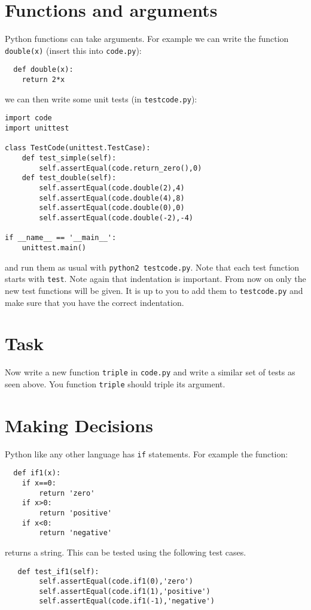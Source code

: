 \documentclass{paper}
\begin{document}
\section*{Functions and arguments}
Python functions can take arguments. For example we can write the
function {\tt double(x)} (insert this into {\tt code.py}):
\begin{lstlisting}
  def double(x):
    return 2*x
\end{lstlisting}
we can then write some unit tests (in {\tt testcode.py}):
\begin{lstlisting}
import code
import unittest

class TestCode(unittest.TestCase):
    def test_simple(self):
        self.assertEqual(code.return_zero(),0)
    def test_double(self):
        self.assertEqual(code.double(2),4)
        self.assertEqual(code.double(4),8)
        self.assertEqual(code.double(0),0)
        self.assertEqual(code.double(-2),-4)

if __name__ == '__main__':
    unittest.main()

  \end{lstlisting} and run them as usual with {\tt python2 testcode.py}. Note that each test
  function starts with {\tt test}. Note again that indentation is
  important. From now on only the new test functions will be given. It is up
  to you to add them to {\tt testcode.py} and make sure that you have the
  correct indentation.

\section{Task}
Now write a new function {\tt triple} in {\tt code.py} and write a
similar set of tests as seen above. You function {\tt triple} should triple
its argument.

\section*{Making Decisions}
Python like any other language has {\tt if} statements. For example
the function:
\begin{lstlisting}
  def if1(x):
    if x==0:
        return 'zero'
    if x>0:
        return 'positive'
    if x<0:
        return 'negative'
\end{lstlisting}
returns a string. This can be tested using the following test cases.
\begin{lstlisting}
   def test_if1(self):
        self.assertEqual(code.if1(0),'zero')
        self.assertEqual(code.if1(1),'positive')
        self.assertEqual(code.if1(-1),'negative')
\end{lstlisting}
\end{document}
